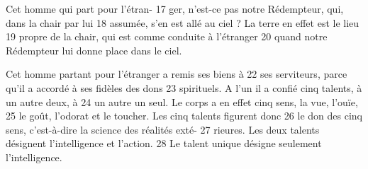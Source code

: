 Cet homme qui part pour l'étran-	 
17	 	ger, n'est-ce pas notre Rédempteur, qui, dans la chair par lui	 
18	 	assumée, s'en est allé au ciel ? La terre en effet est le lieu	 
19	 	propre de la chair, qui est comme conduite à l'étranger	 
20	 	quand notre Rédempteur lui donne place dans le ciel.

Cet homme partant pour l'étranger a remis ses biens à	 
22	 	ses serviteurs, parce qu'il a accordé à ses fidèles des dons	 
23	 	spirituels. A l'un il a confié cinq talents, à un autre deux, à	 
24	 	un autre un seul. Le corps a en effet cinq sens, la vue, l'ouïe,	 
25	 	le goût, l'odorat et le toucher. Les cinq talents figurent donc	 
26	 	le don des cinq sens, c'est-à-dire la science des réalités exté-	 
27	 	rieures. Les deux talents désignent l'intelligence et l'action.	 
28	 	Le talent unique désigne seulement l'intelligence.

